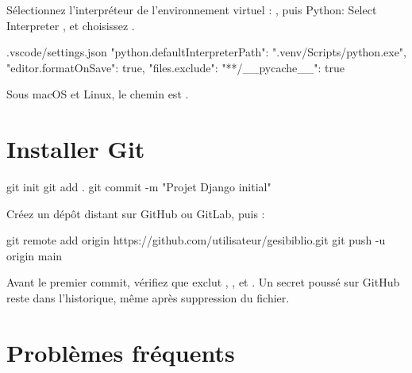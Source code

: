 Sélectionnez l'interpréteur de l'environnement virtuel : , puis
\og Python: Select Interpreter \fg, et choisissez .

\begin{codebox}[tree]{.vscode/settings.json}
{
  "python.defaultInterpreterPath": ".venv/Scripts/python.exe",
  "editor.formatOnSave": true,
  "files.exclude": {
    "**/__pycache__": true
  }
}
\end{codebox}

Sous macOS et Linux, le chemin est .

\section{Installer Git}

\begin{terminal}
git init
git add .
git commit -m "Projet Django initial"
\end{terminal}

Créez un dépôt distant sur GitHub ou GitLab, puis :

\begin{terminal}
git remote add origin https://github.com/utilisateur/gesibiblio.git
git push -u origin main
\end{terminal}

\begin{attention}
Avant le premier commit, vérifiez que  exclut ,
,  et . Un secret poussé sur GitHub reste
dans l'historique, même après suppression du fichier.
\end{attention}

\section{Problèmes fréquents}

